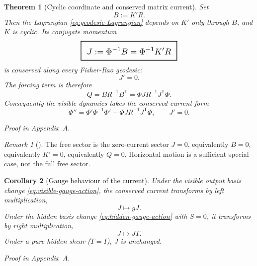\documentclass[11pt,a4paper]{article}
\numberwithin{equation}{section}
\newcommand{\geomboxed}[1]{%
  \setlength{\fboxsep}{8pt}%
  \setlength{\fboxrule}{0.9pt}%
  \fbox{\scalebox{1.22}{$\displaystyle #1$}}%
}
\theoremstyle{thmcompact}
\newtheorem{theorem}{Theorem}[section]
\newtheorem{corollary}[theorem]{Corollary}
\theoremstyle{remark}
\newtheorem*{remarkplain}{Remark}
\newenvironment{remark}[1][]%
{\begin{remarkbox}\begin{remarkplain}[#1]\normalfont}
{\end{remarkplain}\end{remarkbox}}
\newcommand{\proofappendix}{\par{\hfill\scriptsize\emph{Proof in Appendix~A.}}\par}
\begin{document}
\begin{theorem}[Cyclic coordinate and conserved matrix current]
\label{thm:cyclic-current}
Set
\begin{equation}
B:=K'R.
\label{eq:B-adapted}
\end{equation}
Then the Lagrangian \eqref{eq:geodesic-Lagrangian} depends on $K'$ only through $B$, and $K$ is cyclic. Its conjugate momentum
\begin{equation}
\geomboxed{J:=\Phi^{-1}B=\Phi^{-1}K'R}
\label{eq:J-def}
\end{equation}
is conserved along every Fisher-Rao geodesic:
\begin{equation}
J'=0.
\label{eq:J-conserved}
\end{equation}
The forcing term is therefore
\begin{equation}
Q=BR^{-1}B^{\mathsf T}=\Phi J R^{-1}J^{\mathsf T}\Phi.
\label{eq:Q-J-formula}
\end{equation}
Consequently the visible dynamics takes the conserved-current form
\begin{equation}
\boxed{\Phi''=\Phi'\Phi^{-1}\Phi' - \Phi J R^{-1}J^{\mathsf T}\Phi,
\qquad J'=0.}
\label{eq:EOM-with-J}
\end{equation}
\end{theorem}

\proofappendix

\begin{remark}
The free sector is the zero-current sector $J=0$, equivalently $B=0$, equivalently $K'=0$, equivalently $Q=0$. Horizontal motion is a sufficient special case, not the full free sector.
\end{remark}

\begin{corollary}[Gauge behaviour of the current]
\label{cor:J-gauge}
Under the visible output basis change \eqref{eq:visible-gauge-action}, the conserved current transforms by left multiplication,
\begin{equation}
J\mapsto gJ.
\label{eq:J-visible-gauge}
\end{equation}
Under the hidden basis change \eqref{eq:hidden-gauge-action} with $S=0$, it transforms by right multiplication,
\begin{equation}
J\mapsto JT.
\label{eq:J-hidden-gauge}
\end{equation}
Under a pure hidden shear ($T=I$), $J$ is unchanged.
\end{corollary}

\proofappendix
\end{document}
